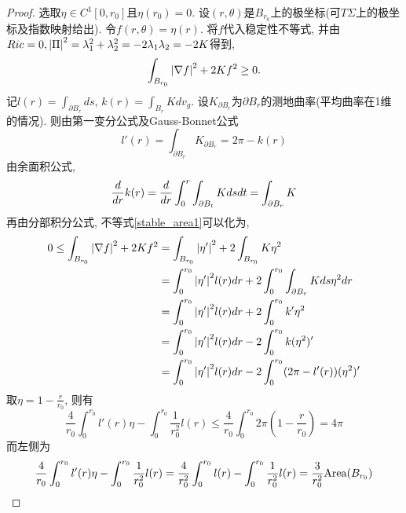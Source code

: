 \begin{proof}
    选取$\eta \in C^1[0,r_0]$且$\eta(r_0)=0$. 设$(r,\theta)$是$B_{r_0}$上的极坐标(可$T\Sigma$上的极坐标及指数映射给出). 令$f(r,\theta)=\eta(r)$. 将$f$代入稳定性不等式, 并由$Ric=0, {\left | {\Pi} \right |}^2=\lambda_1^2+\lambda_2^2=-2\lambda_1\lambda_2=-2K$得到,
    \begin{equation} \label{stable_area1}
        \int_{B_{r_0}} {\left | \nabla f \right |}^2 + 2Kf^2 \ge 0.
    \end{equation}
    记$l(r)=\int_{\partial B_r}ds$, $k(r)=\int_{B_r}Kdv_g$. 设$K_{\partial B_r}$为$\partial B_r$的测地曲率(平均曲率在1维的情况). 则由第一变分公式及Gauss-Bonnet公式
    \begin{equation}
        l'(r)=\int_{\partial B_r}K_{\partial B_r}=2\pi-k(r)
    \end{equation}
    由余面积公式,
    \begin{equation}
        \frac{d}{dr} k(r)=\frac{d}{dr} \int^r_0\int_{\partial B_t}Kdsdt = \int_{\partial B_r}K
    \end{equation}
    再由分部积分公式, 不等式\eqref{stable_area1}可以化为,
    \begin{equation}
        \begin{split}
            0 \le  \int_{B_{r_0}} {\left | \nabla f \right |}^2 + 2Kf^2 &= \int_{B_{r_0}}{\left | \eta' \right |}^2+2\int_{B_{r_0}}K\eta^2 \\
            &= \int^{r_0}_0 {\left | \eta' \right |}^2 l(r)dr+2\int^{r_0}_0\int_{\partial B_r} K ds \eta^2 dr\\
            &= \int^{r_0}_0 {\left | \eta' \right |}^2 l(r)dr+2\int^{r_0}_0k'\eta^2 \\
            &= \int^{r_0}_0 {\left | \eta' \right |}^2 l(r)dr-2\int^{r_0}_0k(\eta^2 )' \\
            &= \int^{r_0}_0 {\left | \eta' \right |}^2 l(r)dr-2\int^{r_0}_0(2\pi- l'(r))(\eta^2 )'
        \end{split}
    \end{equation}
    取$\eta=1-\frac{r}{r_0}$, 则有
    \begin{equation}
        \frac{4}{r_0}\int_0^{r_0}l'(r)\eta- \int^{r_0}_0\frac{1}{r_0^2}l(r) \le \frac{4}{r_0}\int_0^{r_0}2\pi (1-\frac{r}{r_0})=4\pi
    \end{equation}
    而左侧为
    \begin{equation}
        \frac{4}{r_0}\int_0^{r_0}l'(r)\eta- \int^{r_0}_0\frac{1}{r_0^2}l(r) =\frac{4}{r_0^2}\int^{r_0}_0l(r)- \int^{r_0}_0\frac{1}{r_0^2}l(r) =\frac{3}{r_0^2}\text{Area}(B_{r_0})
    \end{equation}
\end{proof}
